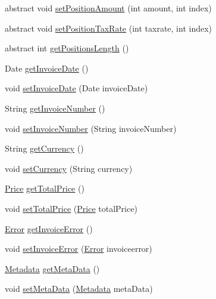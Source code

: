 \begin{DoxyCompactItemize}
\item 
abstract void \hyperlink{class_reduced_invoice_1_1_a_invoice_aef6af27bf12024c16e8e5890243825eb}{set\+Position\+Amount} (int amount, int index)
\item 
abstract void \hyperlink{class_reduced_invoice_1_1_a_invoice_a5919a1c5d917fc62d654441f582f470e}{set\+Position\+Tax\+Rate} (int taxrate, int index)
\item 
abstract int \hyperlink{class_reduced_invoice_1_1_a_invoice_a109ff7a484de183356ebe38737556f11}{get\+Positions\+Length} ()
\item 
Date \hyperlink{class_reduced_invoice_1_1_a_invoice_ac78ce56c3ae003ca87e8144546d7ec3f}{get\+Invoice\+Date} ()
\item 
void \hyperlink{class_reduced_invoice_1_1_a_invoice_adefa18f4aec87c1d4b89233baf6ce9ee}{set\+Invoice\+Date} (Date invoice\+Date)
\item 
String \hyperlink{class_reduced_invoice_1_1_a_invoice_a09231d505794762ea8f363e4689392c8}{get\+Invoice\+Number} ()
\item 
void \hyperlink{class_reduced_invoice_1_1_a_invoice_a20d784a1da556e7bb3c5538c5a6701c4}{set\+Invoice\+Number} (String invoice\+Number)
\item 
String \hyperlink{class_reduced_invoice_1_1_a_invoice_a2c0175f8fdd6c21504bdf6f8e3336cc2}{get\+Currency} ()
\item 
void \hyperlink{class_reduced_invoice_1_1_a_invoice_a83a6ba629194d28ea32c24275d0e14ba}{set\+Currency} (String currency)
\item 
\hyperlink{class_reduced_invoice_1_1_price}{Price} \hyperlink{class_reduced_invoice_1_1_a_invoice_aedc84169ce345d6f7c72b808c305c27b}{get\+Total\+Price} ()
\item 
void \hyperlink{class_reduced_invoice_1_1_a_invoice_ac5c395d78cb3bd54e8e40678bdb46bf0}{set\+Total\+Price} (\hyperlink{class_reduced_invoice_1_1_price}{Price} total\+Price)
\item 
\hyperlink{enum_reduced_invoice_1_1_a_invoice_1_1_error}{Error} \hyperlink{class_reduced_invoice_1_1_a_invoice_ac6335f5b80ba3514a205e46c7170ae5c}{get\+Invoice\+Error} ()
\item 
void \hyperlink{class_reduced_invoice_1_1_a_invoice_a625c87b0ecdcbf896e66e4ad1fe31681}{set\+Invoice\+Error} (\hyperlink{enum_reduced_invoice_1_1_a_invoice_1_1_error}{Error} invoiceerror)
\item 
\hyperlink{class_reduced_invoice_1_1_metadata}{Metadata} \hyperlink{class_reduced_invoice_1_1_a_invoice_a27064d52b653a15a81485e72b54fd687}{get\+Meta\+Data} ()
\item 
void \hyperlink{class_reduced_invoice_1_1_a_invoice_a67f0ef58970f9aff38098d079e738596}{set\+Meta\+Data} (\hyperlink{class_reduced_invoice_1_1_metadata}{Metadata} meta\+Data)
\end{DoxyCompactItemize}
